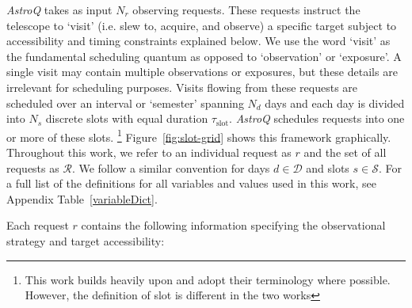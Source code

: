 \documentclass[twocolumn,linenumbers]{aastex63}
\def\slot{\mathrm{slot}}
\def\Dcal{\mathcal{D}}
\def\Rcal{\mathcal{R}}
\def\Scal{\mathcal{S}}
\newcommand{\AstroQ}{\textit{AstroQ}\xspace}
\begin{document}
\AstroQ takes as input $N_r$ observing requests. These requests instruct the telescope to `visit' (i.e. slew to, acquire, and observe) a specific target subject to accessibility and timing constraints explained below. We use the word `visit' as the fundamental scheduling quantum as opposed to `observation' or `exposure'. A single visit may contain multiple observations or exposures, but these details are irrelevant for scheduling purposes. Visits flowing from these requests are scheduled over an interval or `semester' spanning $N_d$ days and each day is divided into $N_s$ discrete slots with equal duration $\tau_{\slot}$. \AstroQ schedules requests into one or more of these slots.%
%
\footnote{This work builds heavily upon \citet{Handley2024_Semester} and adopt their terminology where possible. However, the definition of slot is different in the two works}
%
Figure~\ref{fig:slot-grid} shows this framework graphically. Throughout this work, we refer to an individual request as $r$ and the set of all requests as $\Rcal$. We follow a similar convention for days $d \in \Dcal$ and slots $s \in \Scal$. For a full list of the definitions for all variables and values used in this work, see Appendix Table~\ref{variableDict}.

Each request $r$ contains the following information specifying the observational strategy and target accessibility:
\end{document}
